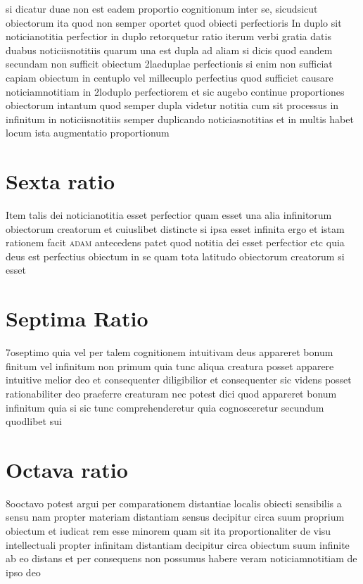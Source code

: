 \documentclass[twoside, openright]{report}
\newcommand{\name}[1]{\textsc{#1}}
\begin{document}
        \pstart
        si dicatur duae non est eadem proportio cognitionum inter se, sicudsicut obiectorum ita quod non semper oportet quod obiecti perfectioris In duplo sit noticianotitia perfectior in duplo retorquetur ratio iterum verbi gratia datis duabus noticiisnotitiis quarum una est dupla ad aliam si dicis quod eandem secundam non sufficit obiectum 2laeduplae perfectionis si enim non sufficiat capiam obiectum in centuplo vel millecuplo perfectius quod sufficiet causare noticiamnotitiam in 2loduplo perfectiorem et sic augebo continue proportiones obiectorum intantum quod semper dupla videtur notitia cum sit processus in infinitum in noticiisnotitiis semper duplicando noticiasnotitias et in multis habet locum ista augmentatio proportionum
        \pend
      
        \bigskip
         \section*{Sexta ratio} 
        \pstart
        Item talis dei noticianotitia esset perfectior quam esset una alia infinitorum obiectorum creatorum et cuiuslibet distincte si ipsa esset infinita ergo et istam rationem facit \name{adam} antecedens patet quod notitia dei esset perfectior etc quia deus est perfectius obiectum in se quam tota latitudo obiectorum creatorum si esset 
        \pend
      
        \bigskip
         \section*{Septima Ratio} 
        \pstart
         7oseptimo quia vel per talem cognitionem intuitivam deus appareret bonum finitum vel infinitum non primum quia tunc aliqua creatura posset apparere intuitive melior deo et consequenter diligibilior et consequenter sic videns posset rationabiliter deo praeferre creaturam nec potest dici quod appareret bonum infinitum quia si sic tunc comprehenderetur quia cognosceretur secundum quodlibet sui
        \pend
      
        \bigskip
         \section*{Octava ratio} 
        \pstart
        8ooctavo potest argui per comparationem distantiae localis obiecti sensibilis a sensu nam propter materiam distantiam sensus decipitur circa suum proprium obiectum et iudicat rem esse minorem quam sit ita proportionaliter de visu intellectuali propter infinitam distantiam decipitur circa obiectum suum infinite ab eo distans et per consequens non possumus habere veram noticiamnotitiam de ipso deo
        \pend
     
\end{document}
